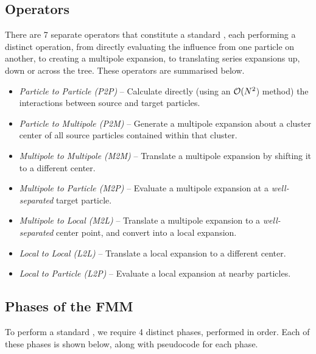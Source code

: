 \subsection{Operators}\label{subsec:fmm_operators}

There are 7 separate operators that constitute a standard {\fmm}, each performing a distinct operation, from directly evaluating the influence from one particle on another, to creating a multipole expansion, to translating series expansions up, down or across the tree. These operators are summarised below.

\begin{itemize}

\item \emph{Particle to Particle (P2P)} -- Calculate directly (using an $\mathcal{O}(N^{2}$) method) the interactions between source and target particles.

\item \emph{Particle to Multipole (P2M)} -- Generate a multipole expansion about a cluster center of all source particles contained within that cluster.

\item \emph{Multipole to Multipole (M2M)} -- Translate a multipole expansion by shifting it to a different center.

\item \emph{Multipole to Particle (M2P)} -- Evaluate a multipole expansion at a \emph{well-separated} target particle.

\item \emph{Multipole to Local (M2L)} -- Translate a multipole expansion to a \emph{well-separated} center point, and convert into a local expansion.

\item \emph{Local to Local (L2L)} -- Translate a local expansion to a different center.

\item \emph{Local to Particle (L2P)} -- Evaluate a local expansion at nearby particles.

\end{itemize}

\subsection{Phases of the FMM}\label{subsec:fmm_phases}

To perform a standard {\fmm}, we require 4 distinct phases, performed in order. Each of these phases is shown below, along with pseudocode for each phase.

